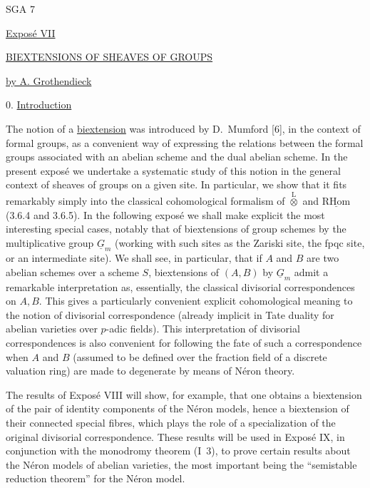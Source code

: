 

\begin{center}
SGA 7

\vspace{1em}
\underline{Expos\'e VII}

\vspace{1em}
\underline{BIEXTENSIONS OF SHEAVES OF GROUPS}

\vspace{1em}
\underline{by A. Grothendieck}
\end{center}

0. \underline{Introduction}

The notion of a \underline{biextension} was introduced by D.~Mumford
[6], in the context of formal groups, as a convenient way of expressing
the relations between the formal groups associated with an abelian scheme
and the dual abelian scheme. In the present expos\'e we undertake a
systematic study of this notion in the general context of sheaves of
groups on a given site. In particular, we show that it fits remarkably
simply into the classical cohomological formalism of
$\overset{\mathrm L}{\otimes}$ and $\underline{\mathrm{RHom}}$
(3.6.4 and 3.6.5). In the following expos\'e we shall make explicit the
most interesting special cases, notably that of biextensions of group
schemes by the multiplicative group $\underline G_m$ (working with such
sites as the Zariski site, the fpqc site, or an intermediate site). We
shall see, in particular, that if $A$ and $B$ are two abelian schemes over
a scheme $S$, biextensions of $(A,B)$ by $\underline G_m$ admit a
remarkable interpretation as, essentially, the classical divisorial
correspondences on $A,B$. This gives a particularly convenient explicit
cohomological meaning to the notion of divisorial correspondence (already
implicit in Tate duality for abelian varieties over $p$-adic fields).
This interpretation of divisorial correspondences is also convenient for
following the fate of such a correspondence when $A$ and $B$ (assumed to
be defined over the fraction field of a discrete valuation ring) are made
to degenerate by means of N\'eron theory.


The results of Expos\'e VIII will show, for example, that one obtains a
biextension of the pair of identity components of the N\'eron models,
hence a biextension of their connected special fibres, which plays the
role of a specialization of the original divisorial correspondence.
These results will be used in Expos\'e IX, in conjunction with the
monodromy theorem (I~3), to prove certain results about the N\'eron models
of abelian varieties, the most important being the ``semistable reduction
theorem'' for the N\'eron model.

